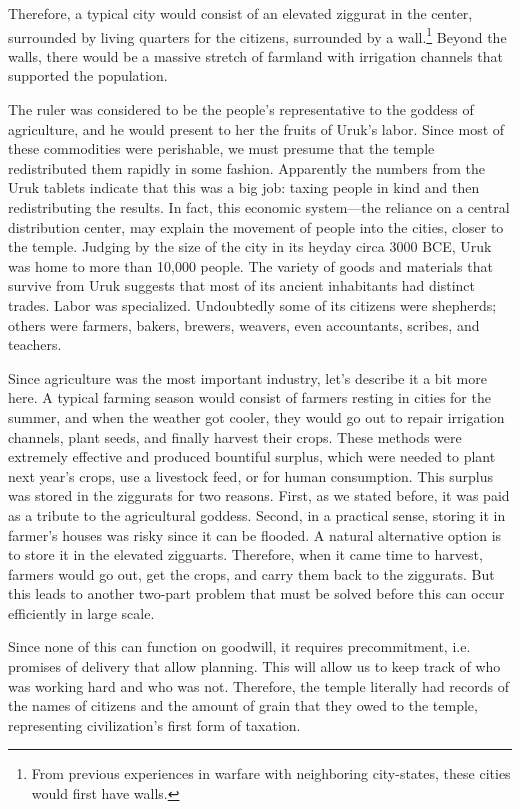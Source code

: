\documentclass{article}
\begin{document}
    Therefore, a typical city would consist of an elevated ziggurat in the center, surrounded by living quarters for the citizens, surrounded by a wall.\footnote{From previous experiences in warfare with neighboring city-states, these cities would first have walls. } Beyond the walls, there would be a massive stretch of farmland with irrigation channels that supported the population.

    The ruler was considered to be the people's representative to the goddess of agriculture, and he would present to her the fruits of Uruk's labor. Since most of these commodities were perishable, we must presume that the temple redistributed them rapidly in some fashion. Apparently the numbers from the Uruk tablets indicate that this was a big job: taxing people in kind and then redistributing the results. In fact, this economic system—the reliance on a central distribution center, may explain the movement of people into the cities, closer to the temple. Judging by the size of the city in its heyday circa 3000 BCE, Uruk was home to more than 10,000 people. The variety of goods and materials that survive from Uruk suggests that most of its ancient inhabitants had distinct trades. Labor was specialized. Undoubtedly some of its citizens were shepherds; others were farmers, bakers, brewers, weavers, even accountants, scribes, and teachers.

    Since agriculture was the most important industry, let's describe it a bit more here. A typical farming season would consist of farmers resting in cities for the summer, and when the weather got cooler, they would go out to repair irrigation channels, plant seeds, and finally harvest their crops. These methods were extremely effective and produced bountiful surplus, which were needed to plant next year's crops, use a livestock feed, or for human consumption. This surplus was stored in the ziggurats for two reasons. First, as we stated before, it was paid as a tribute to the agricultural goddess. Second, in a practical sense, storing it in farmer's houses was risky since it can be flooded. A natural alternative option is to store it in the elevated zigguarts. Therefore, when it came time to harvest, farmers would go out, get the crops, and carry them back to the ziggurats. But this leads to another two-part problem that must be solved before this can occur efficiently in large scale. 

    \begin{finance}
      Since none of this can function on goodwill, it requires precommitment, i.e. promises of delivery that allow planning. This will allow us to keep track of who was working hard and who was not. Therefore, the temple literally had records of the names of citizens and the amount of grain that they owed to the temple, representing civilization's first form of taxation. 
    \end{finance}
\end{document}
